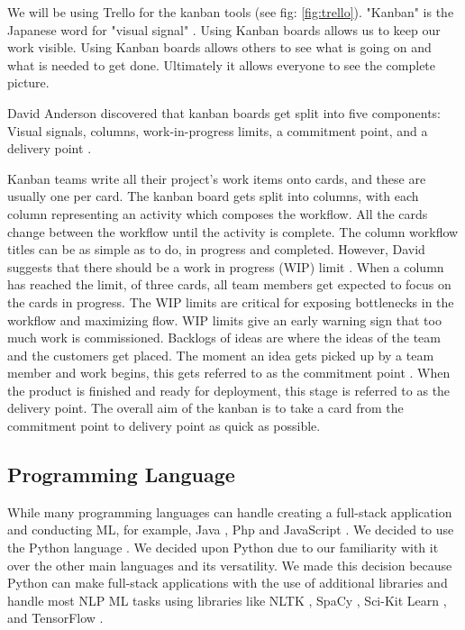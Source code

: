 	
	We will be using Trello for the kanban tools (see fig: \ref{fig:trello}). "Kanban" is the Japanese word for "visual signal" \cite{kanbanmeaning}. Using Kanban boards allows us to keep our work visible. Using Kanban boards allows others to see what is going on and what is needed to get done. Ultimately it allows everyone to see the complete picture.
	
	David Anderson discovered that kanban boards get split into five components: Visual signals, columns, work-in-progress limits, a commitment point, and a delivery point \cite{anderson2010kanban}.
	
	Kanban teams write all their project's work items onto cards, and these are usually one per card. The kanban board gets split into columns, with each column representing an activity which composes the workflow. All the cards change between the workflow until the activity is complete. The column workflow titles can be as simple as to do, in progress and completed. However, David suggests that there should be a work in progress (WIP) limit \cite{anderson2010kanban}. When a column has reached the limit, of three cards, all team members get expected to focus on the cards in progress. The WIP limits are critical for exposing bottlenecks in the workflow and maximizing flow. WIP limits give an early warning sign that too much work is commissioned. Backlogs of ideas are where the ideas of the team and the customers get placed. The moment an idea gets picked up by a team member and work begins, this gets referred to as the commitment point \cite{anderson2010kanban}. When the product is finished and ready for deployment, this stage is referred to as the delivery point. The overall aim of the kanban is to take a card from the commitment point to delivery point as quick as possible. 
	
	
	\subsection{Programming Language}
	While many programming languages can handle creating a full-stack application and conducting ML, for example, Java \cite{arnold2005java}, Php \cite{bakken2000php} and JavaScript \cite{flanagan2006javascript}. We decided to use the Python language \cite{Python}. We decided upon Python due to our familiarity with it over the other main languages and its versatility. We made this decision because Python can make full-stack applications with the use of additional libraries and handle most NLP ML tasks using libraries like NLTK \cite{loper2002nltk}, SpaCy \cite{spacy2}, Sci-Kit Learn \cite{scikit-learn}, and TensorFlow \cite{tensorflow2015-whitepaper}.
	
